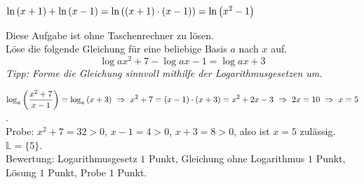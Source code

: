 \documentclass[11pt]{exam}
\begin{document}
\begin{questions}
{\begin{solution}
		$\ln{x+1}+\ln{x-1}=\ln{(x+1)\*(x-1)}=\ln{x^2-1}$
\end{solution}}
{\vfill}

\newpage
{} Diese Aufgabe ist ohne Taschenrechner zu lösen.\\
Löse die folgende Gleichung für eine beliebige Basis $a$ nach $x$ auf. \[\log{a}{x^2+7}-\log{a}{x-1}=\log{a}{x+3}\] {\textit{Tipp: Forme die Gleichung sinnvoll mithilfe der Logarithmusgesetzen um.}}
{\begin{solution}
		$\ds\log{a}{\frac{x^2+7}{x-1}}=\log{a}{x+3}\ \Rightarrow\ x^2+7=(x-1)\*(x+3)=x^2+2x-3\ \Rightarrow\ 2x=10\ \Rightarrow\ x=5$.\\
		Probe: $x^2+7=32>0$, $x-1=4>0$, $x+3=8>0$, also ist $x=5$ zulässig. $\mathbb{L}=\{5\}$.\\
		Bewertung: Logarithmusgesetz $1$ Punkt, Gleichung ohne Logarithmus $1$ Punkt, Lösung $1$ Punkt, Probe $1$ Punkt.
\end{solution}}
{\vfill}

\end{questions}
\end{document}
